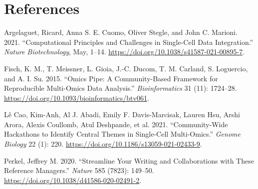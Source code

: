 \documentclass[smallextended]{svjour3}       %
\newlength{\cslhangindent}
\newlength{\cslentryspacingunit} %
\newenvironment{CSLReferences}[2] %
 {%
  \setlength{\parindent}{0pt}
  \ifodd #1
  \let\oldpar\par
  \def\par{\hangindent=\cslhangindent\oldpar}
  \fi
  \setlength{\parskip}{#2\cslentryspacingunit}
 }%
 {}
\begin{document}
\hypertarget{references}{%
\section*{References}\label{references}}

\hypertarget{refs}{}
\begin{CSLReferences}{1}{0}
\leavevmode\hypertarget{ref-argelaguet_computational_2021}{}%
Argelaguet, Ricard, Anna S. E. Cuomo, Oliver Stegle, and John C. Marioni. 2021. {``Computational Principles and Challenges in Single-Cell Data Integration.''} \emph{Nature Biotechnology}, May, 1--14. \url{https://doi.org/10.1038/s41587-021-00895-7}.

\leavevmode\hypertarget{ref-fisch_omics_2015}{}%
Fisch, K. M., T. Meissner, L. Gioia, J.-C. Ducom, T. M. Carland, S. Loguercio, and A. I. Su. 2015. {``Omics {Pipe}: A Community-Based Framework for Reproducible Multi-Omics Data Analysis.''} \emph{Bioinformatics} 31 (11): 1724--28. \url{https://doi.org/10.1093/bioinformatics/btv061}.

\leavevmode\hypertarget{ref-le_cao_community-wide_2021}{}%
Lê Cao, Kim-Anh, Al J. Abadi, Emily F. Davis-Marcisak, Lauren Hsu, Arshi Arora, Alexis Coullomb, Atul Deshpande, et al. 2021. {``Community-Wide Hackathons to Identify Central Themes in Single-Cell Multi-Omics.''} \emph{Genome Biology} 22 (1): 220. \url{https://doi.org/10.1186/s13059-021-02433-9}.

\leavevmode\hypertarget{ref-perkel2020}{}%
Perkel, Jeffrey M. 2020. {``Streamline Your Writing {{}} and Collaborations {{}} with These Reference Managers.''} \emph{Nature} 585 (7823): 149--50. \url{https://doi.org/10.1038/d41586-020-02491-2}.

\end{CSLReferences}




\end{document}
